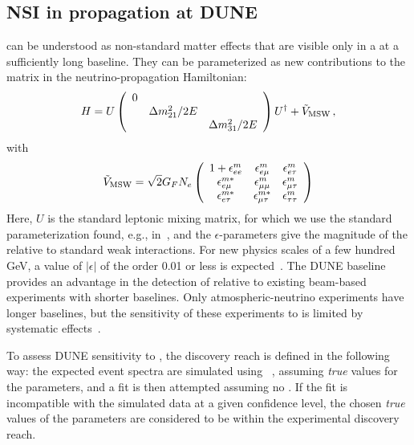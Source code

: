 \subsection{NSI in propagation at DUNE}
  can be understood as non-standard
matter effects that are visible only in a  at a sufficiently long baseline. They can be parameterized as new contributions
to the  matrix in the neutrino-propagation Hamiltonian:
\begin{equation}
  H = U \left( \begin{array}{ccc}
           0 &                    & \\
             & \Delta m_{21}^2/2E & \\
             &                    & \Delta m_{31}^2/2E
         \end{array} \right) U^\dag + \tilde{V}_{\rm MSW} \,,
\end{equation}
with
\begin{equation}
  \tilde{V}_{\rm MSW} = \sqrt{2} G_F N_e
\left(
  \begin{array}{ccc}
    1 + \epsilon^m_{ee}       & \epsilon^m_{e\mu}       & \epsilon^m_{e\tau}  \\
        \epsilon^{m*}_{e\mu}  & \epsilon^m_{\mu\mu}     & \epsilon^m_{\mu\tau} \\
        \epsilon^{m*}_{e\tau} & \epsilon^{m*}_{\mu\tau} & \epsilon^m_{\tau\tau}
  \end{array} 
\right)
\label{eq:epsmatrix}
\end{equation}
Here, $U$ is the standard  leptonic mixing matrix, for which we use the standard parameterization found, e.g., in~\cite{Agashe:2014yua}, 
and the $\epsilon$-parameters give the
magnitude of the  relative to standard weak interactions.  For new physics scales of a few hundred GeV,  a value of $|\epsilon|$ of the order
0.01 or less is
expected~\cite{Davidson:2003ha,GonzalezGarcia:2007ib,Biggio:2009nt}. The DUNE
baseline provides an advantage in the detection of  relative
to existing beam-based experiments with shorter baselines.
Only atmospheric-neutrino experiments have longer baselines, but the sensitivity of these experiments to  is limited by systematic effects~\cite{Adams:2013qkq}.

To assess DUNE sensitivity to   , the  discovery reach is defined in the following way: the expected event spectra are simulated using  ~\cite{Huber:2004ka,Huber:2007ji}, assuming \textit{true} values for the   
parameters, and a fit is then attempted assuming no . If the fit is
incompatible with the simulated data at a given confidence level,
the chosen \emph{true} values of the  parameters are considered to be within the experimental discovery reach.

